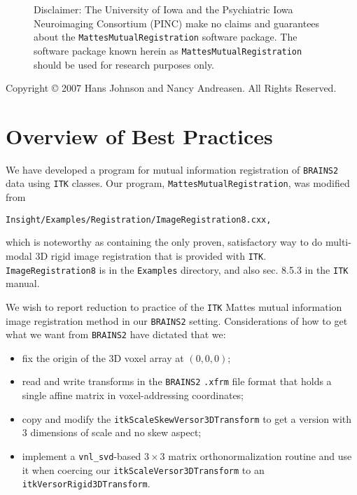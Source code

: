 \documentclass [10pt,twocolumn,twoside,final,letterpaper]{report}
\newcommand{\bcode}{\texttt}
\newcommand{\brainstwoprog}{\bcode{BRAINS2}}
\newcommand{\miregprog}{\bcode{MattesMutualRegistration}}
\begin{document}
\begin{figure}[b]
    \large{
Disclaimer: The University of Iowa and the Psychiatric Iowa Neuroimaging 
Consortium (PINC) make no
claims and guarantees about the \miregprog{} software package. The software
package known herein as \miregprog{} should be used for research purposes only.
    }
\end{figure}
\vspace{2.25in}\par
Copyright {\copyright} 2007 Hans Johnson and Nancy Andreasen. All Rights
Reserved.


\tableofcontents


\chapter{Overview of Best Practices} \label{sec:introduction}
We have developed a program for mutual information registration 
of \brainstwoprog{} \cite{magnotta:brains2} data
using \bcode{ITK} \cite{ibanez:ITKSoftwareGuide14} classes.
Our program, \miregprog{}, was modified from
\begin{verbatim}
Insight/Examples/Registration/ImageRegistration8.cxx,
\end{verbatim}
which is noteworthy as containing the only proven, satisfactory way
to do multi-modal 3D rigid image registration that is provided with \bcode{ITK}.
\bcode{ImageRegistration8} is in the \bcode{Examples} directory, 
and also sec. 8.5.3 in the \bcode{ITK} manual.

\vspace{0.25in}\par

We wish to report reduction to practice of the \bcode{ITK} Mattes mutual information
image registration method in our \brainstwoprog{} setting.
Considerations of how to get what we want from \brainstwoprog{} have dictated that we:
\begin{itemize}
\item fix the origin of the 3D voxel array at $(0,0,0)$;  
\item read and write transforms in the \brainstwoprog{} 
\bcode{.xfrm} file format that holds a single affine matrix in voxel-addressing
coordinates;  
\item copy and modify the \bcode{itkScaleSkewVersor3DTransform}
to get a version with $3$ dimensions of scale and no skew aspect;
\item implement a \bcode{vnl\_svd}-based $3 \times{} 3$ matrix orthonormalization
routine and use it when coercing our \bcode{itkScaleVersor3DTransform} to an
\bcode{itkVersorRigid3DTransform}.
\end{itemize}
\end{document}
